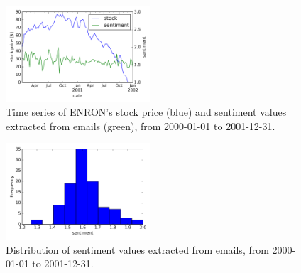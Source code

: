 \documentclass{vldb}
\begin{document}
\begin{figure}[h!]
\centering
\includegraphics[width=0.48\textwidth]{imgs/sentiment_vs_stock}
\caption{Time series of ENRON's stock price (blue) and sentiment values extracted from emails (green), from 2000-01-01 to 2001-12-31.}
\label{fig:sentiment_vs_stock}
\end{figure}

\begin{figure}[h!]
\centering
\includegraphics[width=0.48\textwidth]{imgs/sentiment_dist_hist}
\caption{Distribution of sentiment values extracted from emails, from 2000-01-01 to 2001-12-31.}
\label{fig:sentiment_dist_hist}
\end{figure}
\end{document}
